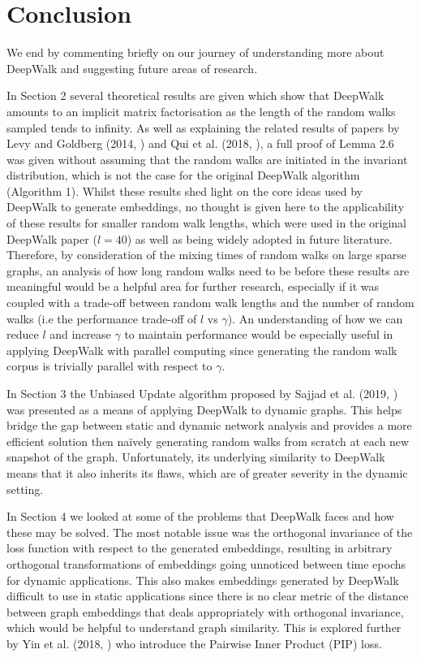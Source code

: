 \documentclass[a4paper]{article}
\begin{document}
\section{Conclusion}
We end by commenting briefly on our journey of understanding more about DeepWalk and suggesting future areas of research.

In Section 2 several theoretical results are given which show that DeepWalk amounts to an implicit matrix factorisation as the length of the random walks sampled tends to infinity.
As well as explaining the related results of papers by Levy and Goldberg (2014, \cite{levy&goldberg}) and  Qui et al. (2018, \cite{qiu2018}), a full proof of Lemma 2.6 was given without assuming that the random walks are initiated in the invariant distribution, which is not the case for the original DeepWalk algorithm (Algorithm 1).
Whilst these results shed light on the core ideas used by DeepWalk to generate embeddings, no thought is given here to the applicability of these results for smaller random walk lengths, which were used in the original DeepWalk paper ($l = 40$) as well as being widely adopted in future literature. Therefore, by consideration of the mixing times of random walks on large sparse graphs, an analysis of how long random walks need to be before these
results are meaningful would be a helpful area for further research, especially if it was coupled with a trade-off between random walk lengths and the number of random walks (i.e the performance trade-off of $l$ vs $\gamma$). An understanding of how we can reduce $l$ and increase $\gamma$ to maintain performance would be especially useful in applying DeepWalk with parallel computing since generating the random walk corpus is trivially parallel with respect to $\gamma$.

In Section 3 the Unbiased Update algorithm proposed by Sajjad et al. (2019, \cite{sajjad2019}) was presented as a means of applying DeepWalk to dynamic graphs. This helps bridge the gap between static and dynamic network analysis and provides a more efficient solution then naïvely generating random walks from scratch at each new snapshot of the graph. Unfortunately, its underlying similarity to DeepWalk means that it also inherits its flaws,
 which are of greater severity in the dynamic setting.

In Section 4 we looked at some of the problems that DeepWalk faces and how these may be solved. The most notable issue was the orthogonal invariance of the loss function with respect to the generated embeddings, resulting in arbitrary orthogonal transformations of embeddings going unnoticed
between time epochs for dynamic applications. This also makes embeddings generated by DeepWalk difficult to use in static applications since there is no clear metric of the distance between graph embeddings that deals appropriately with orthogonal invariance, which would be helpful to understand graph similarity. This is explored further by Yin et al. (2018, \cite{yin2018}) who introduce the Pairwise Inner Product (PIP) loss.
\end{document}
